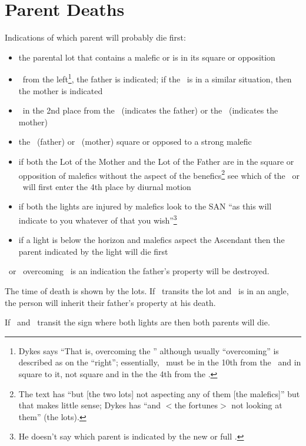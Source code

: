 \section{Parent Deaths}

Indications of which parent will probably die first:
\begin{itemize}[topsep=0em,itemsep=0em]
\item the parental lot that contains a malefic or is in its square or opposition

\item \Mars\Square\Sun\, from the left\footnote{Dykes says ``That is, overcoming the \Sun'' although usually ``overcoming'' is described as on the ``right''; essentially, \Mars\, must be in the 10th from the \Sun\ and in square to it, not square and in the the 4th from the \Sun.}, the father is indicated; if the \Moon\, is in a similar situation, then the mother is indicated

\item \Mars\, in the 2nd place from the \Sun\, (indicates the father) or the \Moon\, (indicates the mother)

\item the \Sun\, (father) or \Moon\, (mother) square or opposed to a strong malefic

\item if both the Lot of the Mother and the Lot of the Father are in the square or opposition of malefics without the aspect of the benefics\footnote{The text has ``but [the two lots] not aspecting any of them [the malefics]'' but that makes little sense; Dykes has ``and $<$the fortunes$>$ not looking at them'' (the lots).} see which of the \Sun\, or \Moon\, will first enter the 4th place by diurnal motion

\item if both the lights are injured by malefics look to the SAN ``as this will indicate to you whatever of that you wish''\footnote{He doesn't say which parent is indicated by the new or full \Moon.}

\item if a light is below the horizon and malefics aspect the Ascendant then the parent indicated by the light will die first
\end{itemize}

\Saturn\Opposition\Mars\, or \Mars\, overcoming \Saturn\,  is an indication the father's property will be destroyed.

The time of death is shown by the lots. If \Saturn\, transits the lot and \Jupiter\, is in an angle, the person will inherit their father's property at his death.

If \Saturn\, and \Mars\, transit the sign where both lights are then both parents will die.